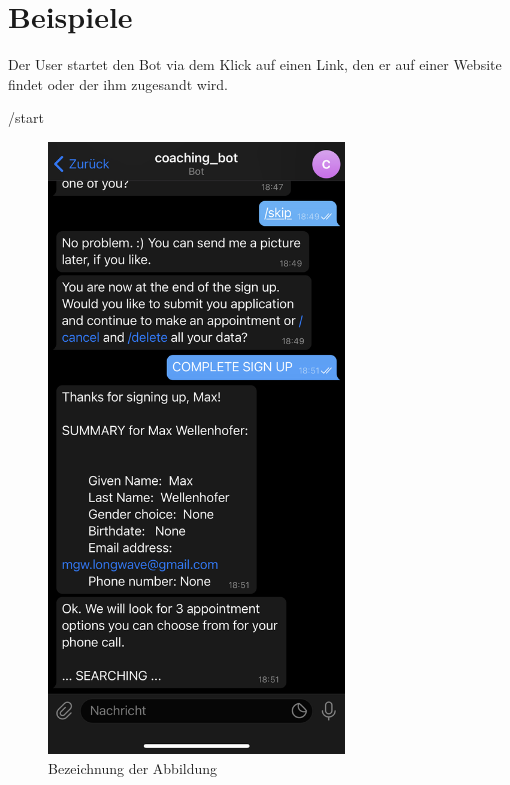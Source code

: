 \chapter{Beispiele}

Der User startet den Bot via dem Klick auf einen Link, den er auf einer Website findet oder der ihm zugesandt wird.

/start
\begin{figure}
	\centering
	\includegraphics[width=0.7\textwidth]{images/coaching_bot_dummy_screenshot.jpeg}
	\caption{Bezeichnung der Abbildung}
	\label{fig: Abbildung 1}
\end{figure}


